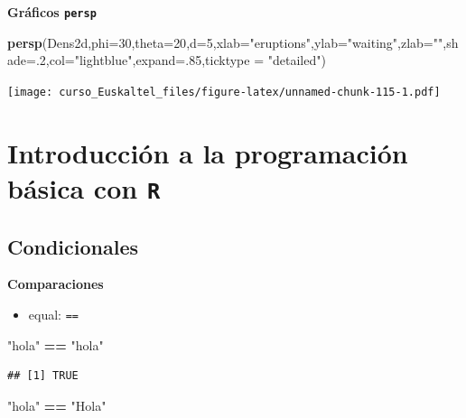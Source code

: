 \documentclass[]{book}
\newenvironment{Shaded}{\begin{snugshade}}{\end{snugshade}}
\newcommand{\KeywordTok}[1]{\textcolor[rgb]{0.13,0.29,0.53}{\textbf{#1}}}
\newcommand{\DataTypeTok}[1]{\textcolor[rgb]{0.13,0.29,0.53}{#1}}
\newcommand{\DecValTok}[1]{\textcolor[rgb]{0.00,0.00,0.81}{#1}}
\newcommand{\StringTok}[1]{\textcolor[rgb]{0.31,0.60,0.02}{#1}}
\newcommand{\OperatorTok}[1]{\textcolor[rgb]{0.81,0.36,0.00}{\textbf{#1}}}
\newcommand{\NormalTok}[1]{#1}
\providecommand{\tightlist}{%
  \setlength{\itemsep}{0pt}\setlength{\parskip}{0pt}}
\begin{document}
\textbf{Gráficos \texttt{persp}}

\begin{Shaded}
\begin{Highlighting}[]
\KeywordTok{persp}\NormalTok{(Dens2d,}\DataTypeTok{phi=}\DecValTok{30}\NormalTok{,}\DataTypeTok{theta=}\DecValTok{20}\NormalTok{,}\DataTypeTok{d=}\DecValTok{5}\NormalTok{,}\DataTypeTok{xlab=}\StringTok{"eruptions"}\NormalTok{,}\DataTypeTok{ylab=}\StringTok{"waiting"}\NormalTok{,}\DataTypeTok{zlab=}\StringTok{""}\NormalTok{,}\DataTypeTok{shade=}\NormalTok{.}\DecValTok{2}\NormalTok{,}\DataTypeTok{col=}\StringTok{"lightblue"}\NormalTok{,}\DataTypeTok{expand=}\NormalTok{.}\DecValTok{85}\NormalTok{,}\DataTypeTok{ticktype =} \StringTok{"detailed"}\NormalTok{)}
\end{Highlighting}
\end{Shaded}

\texttt{[image: curso\_Euskaltel\_files/figure-latex/unnamed-chunk-115-1.pdf]}

\chapter{\texorpdfstring{Introducción a la programación básica con
\texttt{R}}{Introducción a la programación básica con R}}\label{introduccion-a-la-programacion-basica-con-r}

\section{Condicionales}\label{condicionales}

\textbf{Comparaciones}

\begin{itemize}
\tightlist
\item
  equal: \texttt{==}
\end{itemize}

\begin{Shaded}
\begin{Highlighting}[]
  \StringTok{"hola"} \OperatorTok{==}\StringTok{ "hola"}
\end{Highlighting}
\end{Shaded}

\begin{verbatim}
## [1] TRUE
\end{verbatim}

\begin{Shaded}
\begin{Highlighting}[]
  \StringTok{"hola"} \OperatorTok{==}\StringTok{ "Hola"}
\end{Highlighting}
\end{Shaded}
\end{document}
